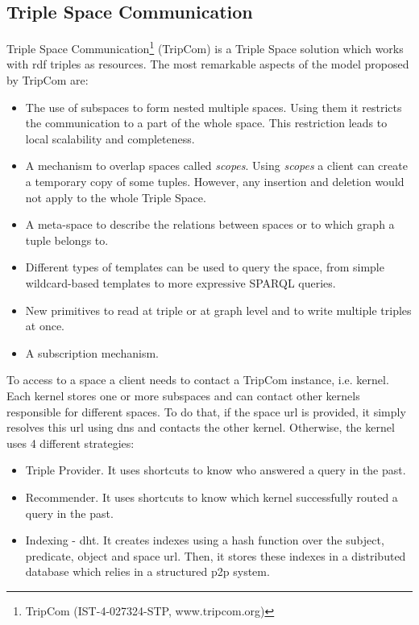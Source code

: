 


\subsection{Triple Space Communication}

Triple Space Communication\footnote{TripCom (IST-4-027324-STP, www.tripcom.org)} (TripCom) is a Triple Space solution which works with \ac{rdf} triples as resources.
The most remarkable aspects of the model proposed by TripCom are:
\begin{itemize}
  \item The use of subspaces to form nested multiple spaces.
	Using them it restricts the communication to a part of the whole space.
	This restriction leads to local scalability and completeness.
  \item A mechanism to overlap spaces called \emph{scopes}.
	Using \emph{scopes} a client can create a temporary copy of some tuples.
	However, any insertion and deletion would not apply to the whole Triple Space.
  \item A meta-space to describe the relations between spaces or to which graph a tuple belongs to.
  \item Different types of templates can be used to query the space, from simple wildcard-based templates to more expressive SPARQL queries.
  \item New primitives to read at triple or at graph level and to write multiple triples at once.
  \item A subscription mechanism.
\end{itemize}


To access to a space a client needs to contact a TripCom instance, i.e. kernel.
Each kernel stores one or more subspaces and can contact other kernels responsible for different spaces.
To do that, if the space \ac{url} is provided, it simply resolves this \ac{url} using \ac{dns} and contacts the other kernel.
Otherwise, the kernel uses 4 different strategies:
\begin{itemize}
  \item Triple Provider. It uses shortcuts to know who answered a query in the past.
  \item Recommender. It uses shortcuts to know which kernel successfully routed a query in the past.
  \item Indexing - \ac{dht}.
	It creates indexes using a hash function over the subject, predicate, object and space \ac{url}.
	Then, it stores these indexes in a distributed database which relies in a structured \ac{p2p} system. %
\end{itemize}


